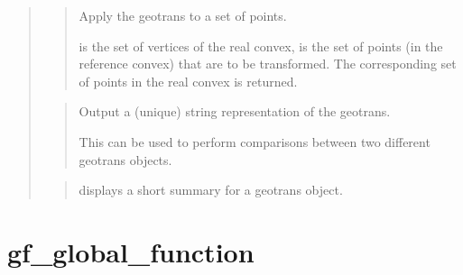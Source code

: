 \documentclass[a4paper,11pt,english]{sphinxmanual}
\begin{document}
\begin{quote}
\begin{quote}
\sphinxAtStartPar
Apply the geotrans to a set of points.

\sphinxAtStartPar
{} is the set of vertices of the real convex,  is the set
of points (in the reference convex) that are to be transformed.
The corresponding set of points in the real convex is returned.
\end{quote}

\sphinxAtStartPar
{}
\begin{quote}

\sphinxAtStartPar
Output a (unique) string representation of the geotrans.

\sphinxAtStartPar
This can be used to perform comparisons between two
different geotrans objects.
\end{quote}

\sphinxAtStartPar
{}
\begin{quote}

\sphinxAtStartPar
displays a short summary for a geotrans object.
\end{quote}
\end{quote}


\section{gf\_global\_function}
\label{\detokenize{matlab_octave/cmdref_gf_global_function:gf-global-function}}\label{\detokenize{matlab_octave/cmdref_gf_global_function::doc}}
\sphinxAtStartPar
{}

\begin{sphinxVerbatim}[commandchars=\\\{\}]
          
    
    \PYG{p}{[}  \PYG{p}{[}  \PYG{p}{]}\PYG{p}{]}
      
      
\end{sphinxVerbatim}
\end{document}
